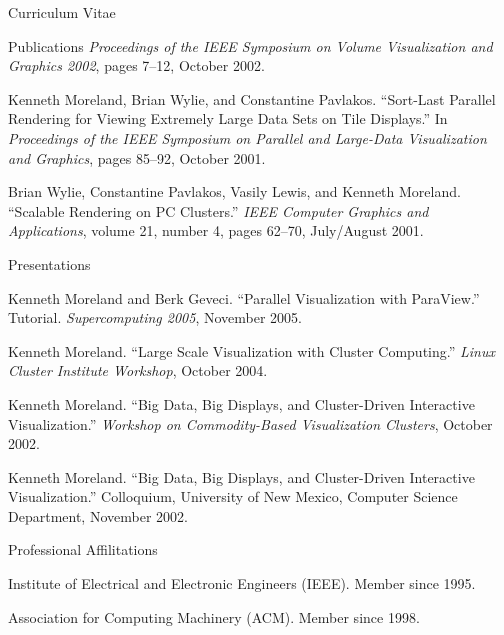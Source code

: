 \documentclass{article}
\begin{document}
\begin{cv}{Curriculum Vitae}
\begin{cvlist}{Publications}
	\emph{Proceedings of the IEEE Symposium on Volume Visualization and
	Graphics 2002}, pages 7--12, October 2002.
      \item Kenneth Moreland, Brian Wylie, and Constantine Pavlakos.
	``Sort-Last Parallel Rendering for Viewing Extremely Large Data
	Sets on Tile Displays.''  In \emph{Proceedings of the IEEE
	Symposium on Parallel and Large-Data Visualization and Graphics},
	pages 85--92, October 2001.
      \item Brian Wylie, Constantine Pavlakos, Vasily Lewis, and Kenneth
	Moreland.  ``Scalable Rendering on PC Clusters.''  \emph{IEEE
	Computer Graphics and Applications}, volume 21, number 4, pages
	62--70, July/August 2001.
    \end{cvlist}

    \begin{cvlist}{Presentations}
      \item Kenneth Moreland and Berk Geveci.  ``Parallel Visualization
        with ParaView.''  Tutorial.  \emph{Supercomputing 2005}, November
        2005.
      \item Kenneth Moreland.  ``Large Scale Visualization with Cluster
        Computing.''  \emph{Linux Cluster Institute Workshop}, October
        2004.
      \item Kenneth Moreland.  ``Big Data, Big Displays, and Cluster-Driven
	Interactive Visualization.''  \emph{Workshop on Commodity-Based
	Visualization Clusters}, October 2002.
      \item Kenneth Moreland.  ``Big Data, Big Displays, and Cluster-Driven
	Interactive Visualization.''  Colloquium, University of New Mexico,
	Computer Science Department, November 2002.
    \end{cvlist}

    \begin{cvlist}{Professional Affilitations}
      \item Institute of Electrical and Electronic Engineers (IEEE).
        Member since 1995.
      \item Association for Computing Machinery (ACM).  Member since 1998.
    \end{cvlist}

  \end{cv}
\end{document}
